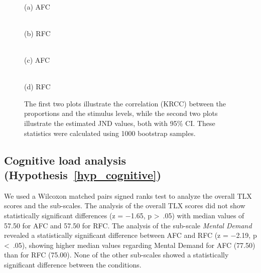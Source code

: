\documentclass[a4paper,conference]{IEEEtran}
\begin{document}
 \begin{figure*}[!ht]
\centering
\begin{minipage}{0.245\linewidth}
\\
\centering
(a) AFC
\end{minipage}
\begin{minipage}{0.245\linewidth}
\\
\centering
(b) RFC
\end{minipage}
\begin{minipage}{0.245\linewidth}
\\
\centering
(c) AFC
\end{minipage}
\begin{minipage}{0.245\linewidth}
\\
\centering
(d) RFC
\end{minipage}
\caption{The first two plots illustrate the correlation (KRCC) between the proportions and the stimulus levels, while the second two plots illustrate the estimated JND values, both with 95\% CI. These statistics were calculated using 1000 bootstrap samples.}
\label{fig:KRCC_JND}
\end{figure*} 

\subsection{Cognitive load analysis (Hypothesis~\ref{hyp_cognitive})}
We used a Wilcoxon matched pairs signed ranks test to analyze the overall TLX scores and the sub-scales. The analysis of the overall TLX scores did not show statistically significant differences (z = $-$1.65, p \textgreater~.05) with median values of 57.50 for AFC and 57.50 for RFC. The analysis of the sub-scale \textit{Mental Demand} revealed a statistically significant difference between AFC and RFC (z = $-$2.19, p \textless~.05), showing higher median values regarding Mental Demand for AFC (77.50) than for RFC (75.00). None of the other sub-scales showed a statistically significant difference between the conditions.
\end{document}
